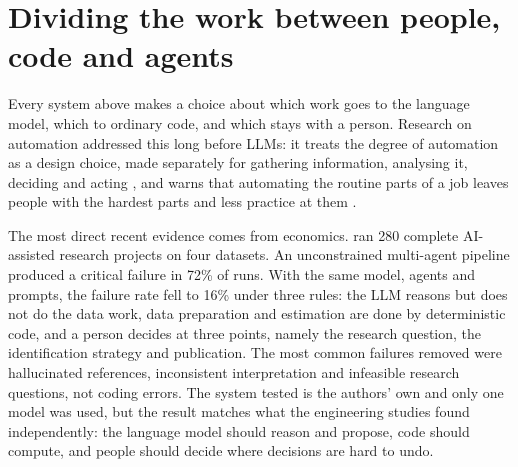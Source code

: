 \section{Dividing the work between people, code and agents}

Every system above makes a choice about which work goes to the language model, which to ordinary code, and which stays with a person.
Research on automation addressed this long before LLMs: it treats the degree of automation as a design choice, made separately for gathering information, analysing it, deciding and acting \citep{parasuraman2000model}, and warns that automating the routine parts of a job leaves people with the hardest parts and less practice at them \citep{bainbridge1983ironies}.

The most direct recent evidence comes from economics.
\citet{zhu2026human} ran 280 complete AI-assisted research projects on four datasets.
An unconstrained multi-agent pipeline produced a critical failure in 72\% of runs.
With the same model, agents and prompts, the failure rate fell to 16\% under three rules: the LLM reasons but does not do the data work, data preparation and estimation are done by deterministic code, and a person decides at three points, namely the research question, the identification strategy and publication.
The most common failures removed were hallucinated references, inconsistent interpretation and infeasible research questions, not coding errors.
The system tested is the authors' own and only one model was used, but the result matches what the engineering studies found independently: the language model should reason and propose, code should compute, and people should decide where decisions are hard to undo.
